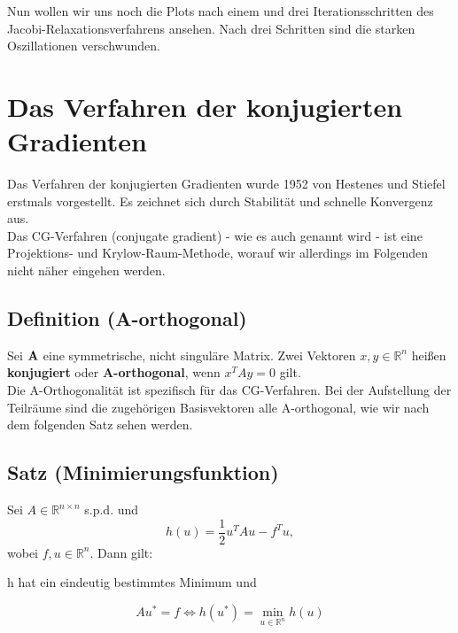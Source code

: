 
Nun wollen wir uns noch die Plots nach einem und drei Iterationsschritten des Jacobi-Relaxationsverfahrens ansehen. Nach drei Schritten sind die starken Oszillationen verschwunden.


\section{Das Verfahren der konjugierten Gradienten}\label{s.Das Verfahren der konjugierten Gradienten}

Das Verfahren der konjugierten Gradienten wurde 1952 von Hestenes und Stiefel erstmals vorgestellt. Es zeichnet sich durch Stabilität und schnelle Konvergenz aus. \\
Das CG-Verfahren (conjugate gradient) - wie es auch genannt wird - ist eine Projektions- und Krylow-Raum-Methode, worauf wir allerdings im Folgenden nicht näher eingehen werden.

\subsection{Definition (A-orthogonal)}\label{ss.A-orthogonal}
Sei ${\textbf{A}}$ eine symmetrische, nicht singuläre Matrix. Zwei Vektoren $x,y \in \mathbb{R}^{n}$ heißen \textbf{konjugiert} oder \textbf{A-orthogonal}, wenn $x^{T}Ay = 0$ gilt.\\

Die A-Orthogonalität ist spezifisch für das CG-Verfahren. Bei der Aufstellung der Teilräume sind die zugehörigen Basisvektoren alle A-orthogonal, wie wir nach dem folgenden Satz sehen werden.

\subsection{Satz (Minimierungsfunktion)}
Sei $A\in\mathbb{R}^{n \times n}$ s.p.d. und
\begin{equation}
h(u) = \frac {1} {2} u^{T}Au - f^{T}u,
\end{equation}
wobei $f,u \in \mathbb{R}^{n}$. Dann gilt:
\begin{center}
h hat ein eindeutig bestimmtes Minimum und
\end{center}
\begin{equation}
Au^{*} = f \Longleftrightarrow h(u^{*}) = \underset{u\in\mathbb{R}^{n}}{\min} h(u)
\end{equation}

